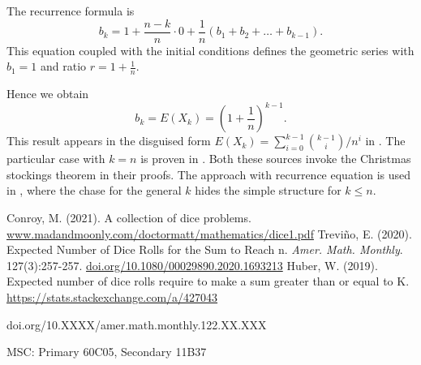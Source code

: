 \documentclass{article}
\theoremstyle{plain}
\begin{document}
\begin{filler}
The recurrence formula is
\[
b_k = 1 + \frac{n - k}{n} \cdot 0 + \frac{1}{n} (b_1 + b_2 + \ldots + b_{k-1}).
\]
This equation coupled with the initial conditions defines the geometric series with $b_1 = 1$ and ratio $r = 1 + \frac{1}{n}$.

Hence we obtain
\[
b_k = E(X_k) = \left( 1 + \frac{1}{n} \right)^{k-1}.
\]
This result appears in the disguised form $E(X_k) = \sum_{i=0}^{k-1} \binom{k-1}{i} / n^i$ in \cite{conroy2021collection}.
The particular case with $k=n$ is proven in \cite{trevino2020expected}.
Both these sources invoke the Christmas stockings theorem in their proofs.
The approach with recurrence equation is used in \cite{427043}, 
where the chase for the general $k$ hides the simple structure for $k\leq n$. 


\begin{thebibliography}{1}
 Conroy, M. (2021). A collection of dice problems. \url{www.madandmoonly.com/doctormatt/mathematics/dice1.pdf}
 Trevi{\~n}o, E. (2020). Expected Number of Dice Rolls for the Sum to Reach n. \textit{Amer. Math. Monthly}. 127(3):257-257.
\url{doi.org/10.1080/00029890.2020.1693213}
 Huber, W. (2019). Expected number of dice rolls require to make a sum greater than or equal to K. \url{https://stats.stackexchange.com/a/427043}
\end{thebibliography}




\bigskip
\footnoterule
\footnotesize{doi.org/10.XXXX/amer.math.monthly.122.XX.XXX}

\footnotesize{MSC: Primary 60C05, Secondary 11B37}



\end{filler}
\end{document}
